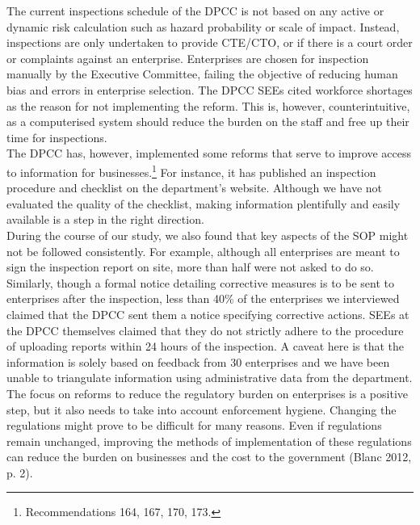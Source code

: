 \documentclass[a4paper, 12pt]{article}
\begin{document}
	The current inspections schedule of the DPCC is not based on any active or dynamic risk calculation such as hazard probability or scale of impact. Instead, inspections are only undertaken to provide CTE/CTO, or if there is a court order or complaints against an enterprise. Enterprises are chosen for inspection manually by the Executive Committee, failing the objective of reducing human bias and errors in enterprise selection. The DPCC SEEs cited workforce shortages as the reason for not implementing the reform. This is, however, counterintuitive, as a computerised system should reduce the burden on the staff and free up their time for inspections. \\
	
	The DPCC has, however, implemented some reforms that serve to improve access to information for businesses.\footnote{Recommendations 164, 167, 170, 173.} For instance, it has published an inspection procedure and checklist on the department’s website. Although we have not evaluated the quality of the checklist, making information plentifully and easily available is a step in the right direction. \\
	
	During the course of our study, we also found that key aspects of the SOP might not be followed consistently. For example, although all enterprises are meant to sign the inspection report on site, more than half were not asked to do so. Similarly, though a formal notice detailing corrective measures is to be sent to enterprises after the inspection, less than 40\% of the enterprises we interviewed claimed that the DPCC sent them a notice specifying corrective actions. SEEs at the DPCC themselves claimed that they do not strictly adhere to the procedure of uploading reports within 24 hours of the inspection. A caveat here is that the information is solely based on feedback from 30 enterprises and we have been unable to triangulate information using administrative data from the department. \\
	
	The focus on reforms to reduce the regulatory burden on enterprises is a positive step, but it also needs to take into account enforcement hygiene. Changing the regulations might prove to be difficult for many reasons. Even if regulations remain unchanged, improving the methods of implementation of these regulations can reduce the burden on businesses and the cost to the government (Blanc 2012, p. 2). \\
	
\end{document}
